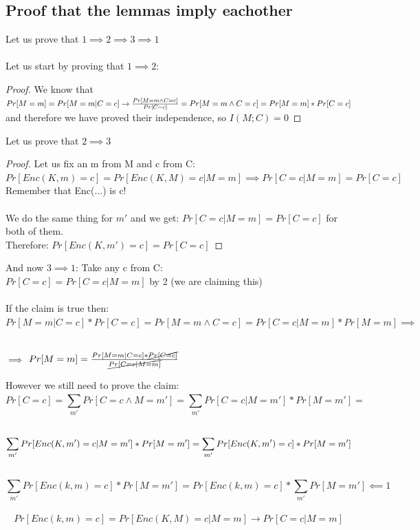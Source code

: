 \documentclass[11pt, a4paper]{article}
\begin{document}
\subsection{Proof that the lemmas imply eachother}
Let us prove that $1 \implies 2 \implies 3 \implies 1$\\\\
Let us start by proving that $1\implies2$:
\begin{proof}
We know that $Pr[M=m] = Pr[M=m|C=c] \rightarrow \frac{Pr[M=m \wedge C=c]}{Pr[C=c]} = Pr[M=m \wedge C=c] \\= Pr[M=m] * Pr[C = c]$
and therefore we have proved their independence, so $I(M;C) = 0$
\end{proof}
Let us prove that $2 \implies 3$
\begin{proof}
Let us fix an m from M and c from C:\\
$Pr[Enc(K,m) = c] = Pr[Enc(K,M) = c | M = m] \implies Pr[C = c | M = m] = Pr[C=c]$ \\Remember that Enc(...) is c!\\\\ We do the same thing for $m'$ and we get: 
$Pr[C=c | M=m] = Pr[C=c]$ for both of them.\\
Therefore: $Pr[Enc(K,m')= c] = Pr[C=c]$
\end{proof}

And now $3 \implies 1$:
Take any c from C:\\
$Pr[C=c] = Pr[C=c|M=m]$ by 2 (we are claiming this)\\\\
If the claim is true then:\\
$Pr[M=m|C=c] * Pr[C=c] = Pr[M=m \wedge C=c] = Pr[C = c | M = m] * Pr[M=m] \implies$\\\\
\begin{center}
   $\implies$ $Pr[M=m] = \frac{Pr[M=m | C=c] * \cancel{Pr[C=c]}}{\cancel{Pr[C=c|M=m]}}$

\end{center}
However we still need to prove the claim:\\
$$Pr[C=c] = \sum_{m'}^{}Pr[C=c \wedge M=m'] = \sum_{m'}^{}Pr[C=c | M=m'] * Pr[M=m'] =$$\\ $$\sum_{m'}^{}Pr[Enc(K,m') = c | M=m'] * Pr[M=m']\\= \sum_{m'}^{}Pr[Enc(K,m') = c] * Pr[M=m'] $$\\
$$ \sum_{m'}^{}Pr[Enc(k,m) = c] * Pr[M=m'] = Pr[Enc(k,m) = c] * \sum_{m'}^{}Pr[M=m'] \impliedby 1$$\\
$$ Pr[Enc(k,m) = c] = Pr[Enc(K,M) = c | M=m] \rightarrow Pr[C=c | M=m]$$
\end{document}
